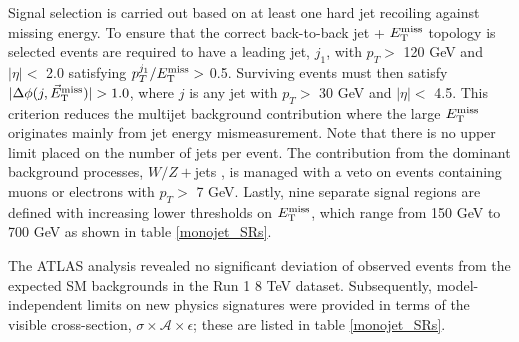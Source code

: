 Signal selection is carried out based on at least one hard jet recoiling against missing energy. To ensure that the correct back-to-back jet + $E_{\mathrm{T}}^{\mathrm{miss}}$ topology is selected events are required to have a leading jet, $j_{1}$, with $p_{T} >$ 120 GeV and $|\eta| <$ 2.0 satisfying $p_{T}^{j_{1}}/E_{\mathrm{T}}^{\mathrm{miss}} >$ 0.5. Surviving events must then satisfy $|\Delta\phi(j,\metvec)|>1.0$, where $j$ is any jet with $p_{T} >$ 30 GeV and $|\eta| <$ 4.5. This criterion reduces the multijet background contribution where the large $E_{\mathrm{T}}^{\mathrm{miss}}$ originates mainly from jet energy mismeasurement. Note that there is no upper limit placed on the number of jets per event. The contribution from the dominant background processes, $W/Z+$jets
, is managed with a veto on events containing muons or electrons with $p_{T}>$ 7 GeV. Lastly, nine separate signal regions are defined with increasing lower thresholds on $E_{\mathrm{T}}^{\mathrm{miss}}$, which range from 150 GeV to 700 GeV as shown in table \ref{monojet_SRs}.

The ATLAS \monojet analysis revealed no significant deviation of observed events from the expected SM backgrounds in the Run 1 8 TeV dataset. Subsequently, model-independent limits on new physics signatures were provided in terms of the visible cross-section, $\sigma\times\mathcal{A}\times\epsilon$; these are listed in table \ref{monojet_SRs}.

